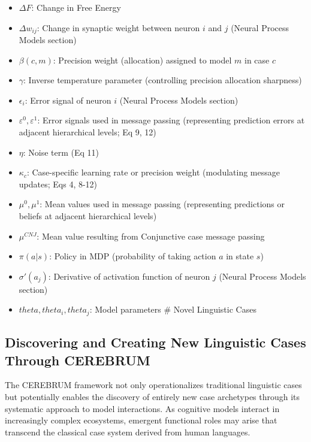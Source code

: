 \documentclass[
  11pt,
  letterpaper,
]{article}
\begin{document}
\begin{itemize}
\item
  \(\Delta F\): Change in Free Energy
\item
  \(\Delta w_{ij}\): Change in synaptic weight between neuron \(i\) and
  \(j\) (Neural Process Models section)
\item
  \(\beta(c,m)\): Precision weight (allocation) assigned to model \(m\)
  in case \(c\)
\item
  \(\gamma\): Inverse temperature parameter (controlling precision
  allocation sharpness)
\item
  \(\epsilon_i\): Error signal of neuron \(i\) (Neural Process Models
  section)
\item
  \(\varepsilon^0, \varepsilon^1\): Error signals used in message
  passing (representing prediction errors at adjacent hierarchical
  levels; Eq 9, 12)
\item
  \(\eta\): Noise term (Eq 11)
\item
  \(\kappa_c\): Case-specific learning rate or precision weight
  (modulating message updates; Eqs 4, 8-12)
\item
  \(\mu^0, \mu^1\): Mean values used in message passing (representing
  predictions or beliefs at adjacent hierarchical levels)
\item
  \(\mu^{CNJ}\): Mean value resulting from Conjunctive case message
  passing
\item
  \(\pi(a|s)\): Policy in MDP (probability of taking action \(a\) in
  state \(s\))
\item
  \(\sigma'(a_j)\): Derivative of activation function of neuron \(j\)
  (Neural Process Models section)
\item
  \(theta, theta_i, theta_j\): Model parameters \# Novel Linguistic
  Cases
\end{itemize}

\hypertarget{discovering-and-creating-new-linguistic-cases-through-cerebrum}{%
\subsection{Discovering and Creating New Linguistic Cases Through
CEREBRUM}\label{discovering-and-creating-new-linguistic-cases-through-cerebrum}}

The CEREBRUM framework not only operationalizes traditional linguistic
cases but potentially enables the discovery of entirely new case
archetypes through its systematic approach to model interactions. As
cognitive models interact in increasingly complex ecosystems, emergent
functional roles may arise that transcend the classical case system
derived from human languages.
\end{document}
